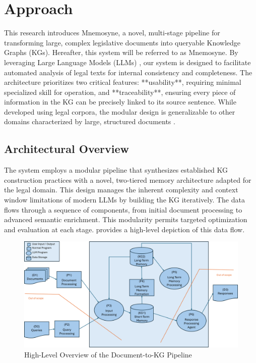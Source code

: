 \section{Approach}
This research introduces Mnemosyne, a novel, multi-stage pipeline for transforming large, complex legislative documents into queryable Knowledge Graphs (KGs). Hereafter, this system will be referred to as Mnemosyne. By leveraging Large Language Models (LLMs) \parencite{RefWorks:RefID:107-benjira2025automated, RefWorks:RefID:162-lairgi2024knowledge}, our system is designed to facilitate automated analysis of legal texts for internal consistency and completeness. The architecture prioritizes two critical features: **usability**, requiring minimal specialized skill for operation, and **traceability**, ensuring every piece of information in the KG can be precisely linked to its source sentence. While developed using legal corpora, the modular design is generalizable to other domains characterized by large, structured documents \parencite{RefWorks:RefID:116-shaham2022scrolls}.

\subsection{Architectural Overview}
The system employs a modular pipeline that synthesizes established KG construction practices \parencite{RefWorks:RefID:118-ji2022survey} with a novel, two-tiered memory architecture adapted for the legal domain. This design manages the inherent complexity and context window limitations of modern LLMs \parencite{RefWorks:RefID:99-liu2025comprehensive} by building the KG iteratively. The data flows through a sequence of components, from initial document processing to advanced semantic enrichment. This modularity permits targeted optimization and evaluation at each stage.  provides a high-level depiction of this data flow.

\begin{figure}[htbp]
    \centering
    \includegraphics[width=\linewidth]{figures/chap3_fig/Proposed Architecture.png}
    \caption{High-Level Overview of the Document-to-KG Pipeline}
    \label{fig:proposed_architecture}
\end{figure}

